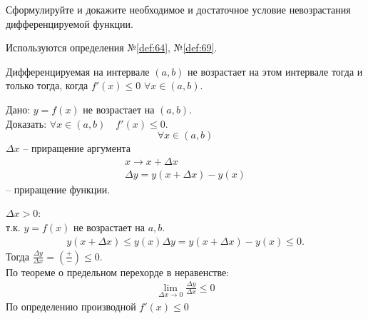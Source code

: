 \begin{question}
    Сформулируйте и докажите необходимое и достаточное условие невозрастания дифференцируемой функции.
\end{question}
\begin{used}
    Используются определения №\ref{def:64}, №\ref{def:69}.
\end{used}
\begin{theorem}
    Дифференцируемая на интервале $(a, b)$ не возрастает на этом интервале тогда и только тогда, когда  $f'(x) \le 0$ $\forall x \in (a, b)$.
\end{theorem}
\begin{necessity}
    Дано: $y=f(x)$ не возрастает на $(a, b)$. \\
    Доказать:  $\forall x \in (a, b) \quad f'(x) \le 0$. \[
        \forall x \in (a, b)
    \] 
    $\Delta x$ -- приращение аргумента
    \begin{gather*}
        x \to  x + \Delta x \\
        \Delta  y = y(x + \Delta x) - y(x)
    \end{gather*}
    -- приращение функции.

    $\Delta x > 0$: \\
    т.к. $y = f(x)$ не возрастает на  $a, b$.
    \begin{gather*}
        y(x + \Delta x) \le  y(x)
        \Delta  y = y(x + \Delta x) - y(x) \le 0.
    \end{gather*}
    Тогда $\frac{\Delta y}{\Delta x} = \left( \frac{+}{-} \right) \le 0$. \\
    По теореме о предельном перехорде в неравенстве: 
    \begin{gather*}
        \lim_{\Delta x \to 0} \frac{\Delta y}{\Delta x} \le 0 
    \end{gather*}
    По определению производной $f'(x) \le 0$
\end{necessity}
